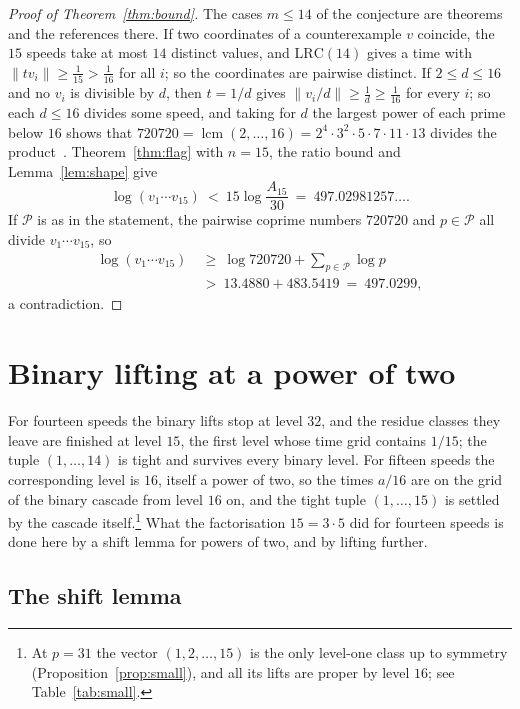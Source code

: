 \documentclass[11pt]{amsart}
\theoremstyle{definition}
\theoremstyle{remark}
\newcommand{\LRC}{\mathrm{LRC}}
\begin{document}
\begin{proof}[Proof of Theorem~\ref{thm:bound}]
The cases $m\le14$ of the conjecture are theorems~\cite{All26} and the
references there. If two coordinates of a counterexample $v$ coincide, the
$15$ speeds take at most $14$ distinct values, and $\LRC(14)$ gives a time
with $\|tv_i\|\ge\frac1{15}>\frac1{16}$ for all $i$; so the coordinates are
pairwise distinct. If $2\le d\le16$ and no $v_i$ is divisible by $d$, then
$t=1/d$ gives $\|v_i/d\|\ge\frac1d\ge\frac1{16}$ for every $i$; so each
$d\le16$ divides some speed, and taking for $d$ the largest power of each
prime below $16$ shows that
$720720=\operatorname{lcm}(2,\dots,16)=2^4\cdot3^2\cdot5\cdot7\cdot11\cdot13$
divides the product~\cite[Lemma~4]{Ros26a}. Theorem~\ref{thm:flag} with
$n=15$, the ratio bound and Lemma~\ref{lem:shape} give
\[
 \log(v_1\cdots v_{15})\ <\ 15\log\frac{A_{15}}{30}\ =\ 497.02981257\ldots .
\]
If $\mathcal P$ is as in the statement, the pairwise coprime numbers
$720720$ and $p\in\mathcal P$ all divide $v_1\cdots v_{15}$, so
\begin{align*}
 \log(v_1\cdots v_{15})&\ \ge\ \log720720+\sum_{p\in\mathcal P}\log p\\
 &\ >\ 13.4880+483.5419\ =\ 497.0299 ,
\end{align*}
a contradiction.
\end{proof}

\section{Binary lifting at a power of two}\label{sec:binary}

For fourteen speeds the binary lifts stop at level $32$, and the residue
classes they leave are finished at level $15$, the first level whose time grid
contains $1/15$; the tuple $(1,\dots,14)$ is tight and survives every binary
level. For fifteen speeds the corresponding level is $16$, itself a power of
two, so the times $a/16$ are on the grid of the binary cascade from level
$16$ on, and the tight tuple $(1,\dots,15)$ is settled by the cascade
itself.\footnote{At $p=31$ the vector $(1,2,\dots,15)$ is the only level-one
class up to symmetry (Proposition~\ref{prop:small}), and all its lifts are
proper by level $16$; see Table~\ref{tab:small}.} What the factorisation
$15=3\cdot5$ did for fourteen speeds is done here by a shift lemma for powers
of two, and by lifting further.

\subsection{The shift lemma}
\end{document}
